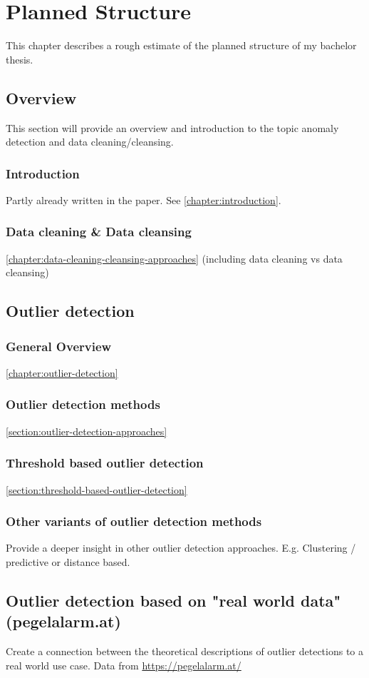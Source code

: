 \chapter{Planned Structure}
This chapter describes a rough estimate of the planned structure of my bachelor thesis.
\section{Overview}
This section will provide an overview and introduction to the topic anomaly detection and data cleaning/cleansing.
\subsection{Introduction}
Partly already written in the paper. See \autoref{chapter:introduction}.
\subsection{Data cleaning \& Data cleansing}
\autoref{chapter:data-cleaning-cleansing-approaches}
(including data cleaning vs data cleansing)
\section{Outlier detection}
\subsection{General Overview}
\autoref{chapter:outlier-detection}

\subsection{Outlier detection methods}
\autoref{section:outlier-detection-approaches}
\subsection{Threshold based outlier detection}
\autoref{section:threshold-based-outlier-detection}
\subsection{Other variants of outlier detection methods}
Provide a deeper insight in other outlier detection approaches. E.g. Clustering / predictive or distance based.
\section{Outlier detection based on "real world data" (pegelalarm.at)}
Create a connection between the theoretical descriptions of outlier detections to a real world use case. Data from \url{https://pegelalarm.at/}

